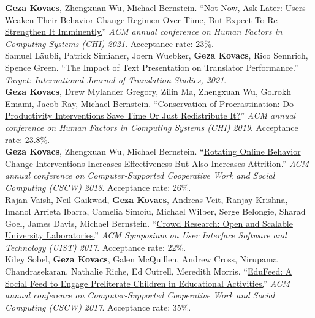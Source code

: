 
\textbf{Geza Kovacs}, {\small Zhengxuan Wu, Michael Bernstein.} ``\href{https://hci.stanford.edu/publications/2021/notnow/notnowasklater.pdf}{Not Now, Ask Later: Users Weaken Their Behavior Change Regimen Over Time, But Expect To Re-Strengthen It Imminently.}'' \emph{ACM annual conference on Human Factors in Computing Systems (CHI) 2021}. Acceptance rate: 23\%.\\ %

{\small Samuel Läubli, Patrick Simianer, Joern Wuebker,} \textbf{Geza Kovacs}, {\small Rico Sennrich, Spence Green.} ``\href{https://arxiv.org/pdf/2011.05978.pdf}{The Impact of Text Presentation on Translator Performance.}'' \emph{Target: International Journal of Translation Studies, 2021}.\\

\textbf{Geza Kovacs}, {\small Drew Mylander Gregory, Zilin Ma, Zhengxuan Wu, Golrokh Emami, Jacob Ray, Michael Bernstein.} ``\href{https://hci.stanford.edu/publications/2019/conservation/conservation-chi2019.pdf}{Conservation of Procrastination: Do Productivity Interventions Save Time Or Just Redistribute It?}'' \emph{ACM annual conference on Human Factors in Computing Systems (CHI) 2019}. Acceptance rate: 23.8\%.\\ %


\textbf{Geza Kovacs}, {\small Zhengxuan Wu, Michael Bernstein.} ``\href{https://hci.stanford.edu/publications/2018/habitlab/habitlab-cscw18.pdf}{Rotating Online Behavior Change Interventions Increases Effectiveness But Also Increases Attrition.}'' \emph{ACM annual conference on Computer-Supported Cooperative Work and Social Computing (CSCW) 2018}. Acceptance rate: 26\%.\\

{\small Rajan Vaish, Neil Gaikwad,} \textbf{Geza Kovacs}, {\small Andreas Veit, Ranjay Krishna, Imanol Arrieta Ibarra, Camelia Simoiu, Michael Wilber, Serge Belongie, Sharad Goel, James Davis, Michael Bernstein.} ``\href{https://hci.stanford.edu/publications/2017/crowdresearch/crowd-research-uist2017.pdf}{Crowd Research: Open and Scalable University Laboratories.}'' \emph{ACM Symposium on User Interface Software and Technology (UIST) 2017}. Acceptance rate: 22\%.\\

{\small Kiley Sobel,} \textbf{Geza Kovacs}, {\small Galen McQuillen, Andrew Cross, Nirupama Chandrasekaran, Nathalie Riche, Ed Cutrell, Meredith Morris.} ``\href{https://www.microsoft.com/en-us/research/wp-content/uploads/2016/10/edufeed.pdf}{EduFeed: A Social Feed to Engage Preliterate Children in Educational Activities.}'' \emph{ACM annual conference on Computer-Supported Cooperative Work and Social Computing (CSCW) 2017}. Acceptance rate: 35\%.\\

